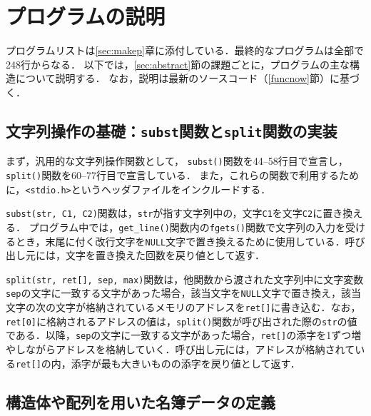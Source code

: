 \section{プログラムの説明}\label{sec:capp}

プログラムリストは\ref{sec:makep}章に添付している．最終的なプログラムは全部で248行からなる．
以下では，\ref{sec:abstract}節の課題ごとに，プログラムの主な構造について説明する．
なお，説明は最新のソースコード（\ref{funcnow}節）に基づく．

\subsection{文字列操作の基礎：\texttt{subst}関数と\texttt{split}関数の実装}

まず，汎用的な文字列操作関数として，
\verb|subst()|関数を44--58行目で宣言し，
\verb|split()|関数を60--77行目で宣言している．
また，これらの関数で利用するために，\verb|<stdio.h>|というヘッダファイルをインクルードする．

\verb|subst(str, C1, C2)|関数は，\verb|str|が指す文字列中の，文字\verb|C1|を文字\verb|C2|に置き換える．
プログラム中では，\verb|get_line()|関数内の\verb|fgets()|関数で文字列の入力を受けるとき，末尾に付く改行文字を\verb|NULL|文字で置き換えるために使用している．呼び出し元には，文字を置き換えた回数を戻り値として返す．

\verb|split(str, ret[], sep, max)|関数は，他関数から渡された文字列中に文字変数\verb|sep|の文字に一致する文字があった場合，該当文字を\verb|NULL|文字で置き換え，該当文字の次の文字が格納されているメモリのアドレスを\verb|ret[]|に書き込む．なお，\verb|ret[0]|に格納されるアドレスの値は，\verb|split()|関数が呼び出された際の\verb|str|の値である．以降，\verb|sep|の文字に一致する文字があった場合，\verb|ret[]|の添字を1ずつ増やしながらアドレスを格納していく．呼び出し元には，アドレスが格納されている\verb|ret[]|の内，添字が最も大きいものの添字を戻り値として返す．

\subsection{構造体や配列を用いた名簿データの定義}

